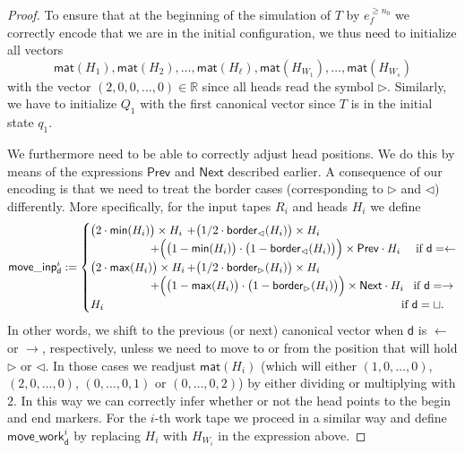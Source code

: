 \begin{proof}
    To ensure that at the beginning of the simulation of $T$ by $e_f^{\geq n_0}$ we correctly encode 
    that we are in the initial configuration, we thus need to initialize all vectors 
    $$\mathsf{mat}(H_1),\mathsf{mat}(H_2),\ldots, \mathsf{mat}(H_\ell), \mathsf{mat}(H_{W_1}),\ldots, \mathsf{mat}(H_{W_s})$$
    with the vector $(2,0,0,\ldots,0)\in\mathbb{R}$ since all heads read the symbol $\rhd$. Similarly, 
    we have to initialize $Q_1$ with the first canonical vector since $T$ is in the initial state $q_1$.

    We furthermore need to be able to correctly adjust head positions. We do this by means of the expressions $\mathsf{Prev}$ and $\mathsf{Next}$	described earlier.
    A consequence of our encoding is that we need to treat the border cases (corresponding to $\rhd$ and 
    $\lhd$) differently. More specifically, for the input tapes $R_i$ and heads $H_i$ we define 
    $$
    \mathsf{move\_inp}^i_{\mathsf{d}}:=
    \begin{cases}
    \bigl(2\cdot\mathsf{min}(H_i)\bigr)\times H_i &\!\!\!\!\!+ \bigl(1/2\cdot\mathsf{border}_{\lhd}(H_i)\bigr)\times H_i \\
    & \hspace{-4em}+\Bigl(\bigl(1-\mathsf{min}(H_i)\bigr)\cdot\bigl(1-\mathsf{border}_{\lhd}(H_i)\bigr)\Bigr)\times \mathsf{Prev}\cdot H_i \quad \text{ if $\mathsf{d}=\leftarrow$}\\
    \bigl(2\cdot \mathsf{max}(H_i)\bigr)\times H_i &\!\!\!\!\! + \bigl(1/2\cdot\mathsf{border}_{\rhd}(H_i)\bigr)\times H_i \\
    & \hspace{-4em}+ \Bigl( \bigl(1-\mathsf{max}(H_i)\bigr) \cdot \bigl(1-\mathsf{border}_{\rhd}(H_i)\bigr) \Bigr)\times \mathsf{Next}\cdot H_i  \quad\!\text{if $\mathsf{d}=\rightarrow$}\\
    H_i & \hspace{18em}\!\text{if $\mathsf{d}=\sqcup$}. 
    \end{cases}
    $$
    In other words, we shift to the previous (or next) canonical vector when $\mathsf{d}$ is $\leftarrow$ 
    or $\rightarrow$, respectively, unless we need to move to or from the position that will hold $\rhd$ 
    or $\lhd$. In those cases we readjust $\mathsf{mat}(H_i)$ (which will either $(1,0,\ldots,0)$, $(2,0,\ldots,0)$, 
    $(0,\ldots,0,1)$ or $(0,\ldots,0,2)$) by either dividing or multiplying with $2$. In this way we can 
    correctly infer whether or not the head points to the begin and end markers. For the $i$-th work tape we 
    proceed in a similar way and define $\mathsf{move\_work}^i_{\mathsf{d}}$ by replacing $H_{i}$ with $H_{W_i}$ in the expression above. 
 

\end{proof}
